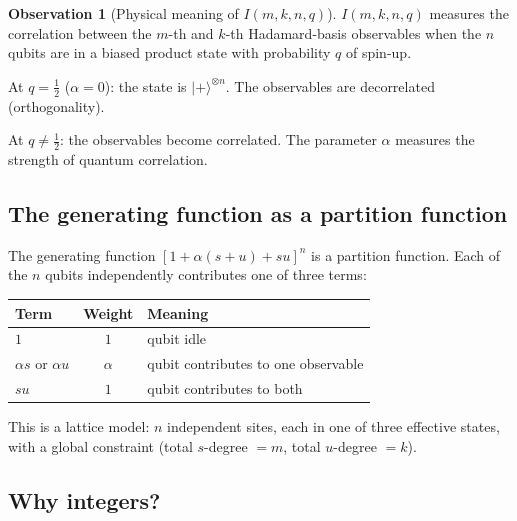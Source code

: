 \documentclass[11pt,a4paper]{article}
\theoremstyle{plain}
\theoremstyle{definition}
\newtheorem{observation}[theorem]{Observation}
\begin{document}
\begin{tcolorbox}[colback=black!5, colframe=black!5, boxrule=0pt,
  sharp corners]
\begin{observation}[Physical meaning of $I(m,k,n,q)$]
\label{obs:Imk}
$I(m,k,n,q)$ measures the correlation between the $m$-th and $k$-th
Hadamard-basis observables when the $n$ qubits are in a biased
product state with probability $q$ of spin-up.

At $q = \tfrac12$ ($\alpha = 0$): the state is $|{+}\rangle^{\otimes
n}$. The observables are decorrelated (orthogonality).

At $q \ne \tfrac12$: the observables become correlated. The
parameter $\alpha$ measures the strength of quantum correlation.
\end{observation}
\end{tcolorbox}

\subsection{The generating function as a partition function}

\begin{tcolorbox}[breakable, colback=yellow!10, colframe=yellow!10,
  boxrule=0pt, sharp corners]
The generating function $[1 + \alpha(s{+}u) + su]^n$ is a partition
function. Each of the $n$ qubits independently contributes one of
three terms:

\begin{center}
\begin{tabular}{lcl}
  \toprule
  Term & Weight & Meaning \\
  \midrule
  $1$ & $1$ & qubit idle \\
  $\alpha s$ or $\alpha u$ & $\alpha$ & qubit contributes to one
    observable \\
  $su$ & $1$ & qubit contributes to both \\
  \bottomrule
\end{tabular}
\end{center}

\medskip
This is a lattice model: $n$ independent sites, each in one of three
effective states, with a global constraint (total $s$-degree $= m$,
total $u$-degree $= k$).
\end{tcolorbox}

\subsection{Why integers?}
\end{document}
